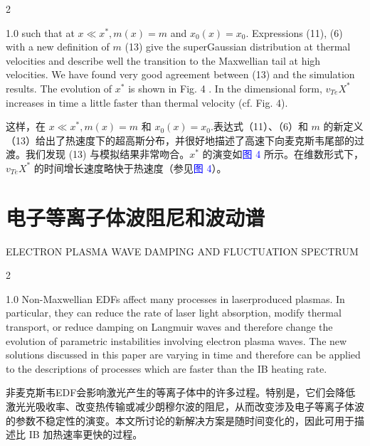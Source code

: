 \documentclass[oneside,onecolumn]{article}
\newcommand\enzhbox[2]{
  	\quad\par \begin{paracol}{2} \colseprulecolor{black} 
  			\begin{spacing}{1.0}
  				\footnotesize  #1
  			\end{spacing}
  		\switchcolumn[1] 
  		#2
  	\end{paracol} 
  }
\begin{document}
\begin{sloppypar}
 
\enzhbox{   such that at $x \ll x^{*}, m(x)=m$ and $x_{0}(x)=x_{0}$. Expressions (11), (6) with a new definition of $m$ (13) give the superGaussian distribution at thermal velocities and describe well the transition to the Maxwellian tail at high velocities. We have found very good agreement between (13) and the simulation results. The evolution of $x^{*}$ is shown in Fig. 4 . In the dimensional form, $v_{T e} X^{*}$ increases in time a little faster than thermal velocity (cf. Fig. 4).
}{
这样，在 $x \ll x^{*}, m(x)=m$ 和 $x_{0}(x)=x_{0}$.表达式（11）、（6）和 $m$ 的新定义（13）给出了热速度下的超高斯分布，并很好地描述了高速下向麦克斯韦尾部的过渡。我们发现 (13) 与模拟结果非常吻合。$x^{*}$ 的演变如\textcolor{blue}{图 4} 所示。在维数形式下，$v_{T e} X^{*}$ 的时间增长速度略快于热速度（参见\textcolor{blue}{图 4}）。

}
  
  \section{电子等离子体波阻尼和波动谱}

 {  \small ELECTRON PLASMA WAVE DAMPING AND FLUCTUATION SPECTRUM\par }
 
\enzhbox{   Non-Maxwellian EDFs affect many processes in laserproduced plasmas. In particular, they can reduce the rate of laser light absorption, modify thermal transport, or reduce damping on Langmuir waves and therefore change the evolution of parametric instabilities involving electron plasma waves. The new solutions discussed in this paper are varying in time and therefore can be applied to the descriptions of processes which are faster than the IB heating rate.
}{
非麦克斯韦EDF会影响激光产生的等离子体中的许多过程。特别是，它们会降低激光光吸收率、改变热传输或减少朗穆尔波的阻尼，从而改变涉及电子等离子体波的参数不稳定性的演变。本文所讨论的新解决方案是随时间变化的，因此可用于描述比 IB 加热速率更快的过程。

}
  

\end{sloppypar}
\end{document}
